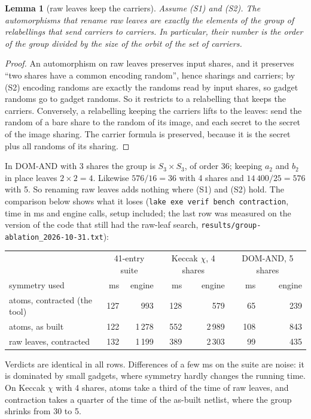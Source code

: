 \documentclass[11pt,a4paper]{article}
\newtheorem{lemma}[theorem]{Lemma}
\theoremstyle{definition}
\theoremstyle{remark}
\newcommand{\code}[1]{\texttt{\small #1}}
\begin{document}
\begin{lemma}[raw leaves keep the carriers]\label{lem:carriers}
Assume (S1) and (S2).  The automorphisms that rename raw leaves are exactly the elements of the
group of relabellings that send carriers to carriers.  In particular, their number is the order
of the group divided by the size of the orbit of the set of carriers.
\end{lemma}
\begin{proof}
An automorphism on raw leaves preserves input shares, and it preserves ``two shares have a common
encoding random'', hence sharings and carriers; by (S2) encoding randoms are exactly the randoms
read by input shares, so gadget randoms go to gadget randoms.  So it restricts to a relabelling
that keeps the carriers.  Conversely, a relabelling keeping the carriers lifts to the leaves:
send the random of a bare share to the random of its image, and each secret to the secret of the
image sharing.  The carrier formula is preserved, because it is the secret plus all randoms of
its sharing.
\end{proof}

In DOM-AND with 3 shares the group is $S_3\times S_3$, of order 36; keeping $a_2$ and $b_2$ in
place leaves $2\times 2=4$.  Likewise $576/16 = 36$ with 4 shares and $14\,400/25=576$ with 5.
So renaming raw leaves adds nothing where (S1) and (S2) hold.  The comparison below shows what it
loses (\code{lake exe verif bench contraction}, time in ms and engine calls, setup included; the
last row was measured on the version of the code that still had the raw-leaf search,
\code{results/group-ablation\_2026-10-31.txt}):
\begin{center}\small
\begin{tabular}{@{}lrrrrrr@{}}
\toprule
 & \multicolumn{2}{c}{41-entry suite} & \multicolumn{2}{c}{Keccak $\chi$, 4 shares} & \multicolumn{2}{c}{DOM-AND, 5 shares}\\
symmetry used & ms & engine & ms & engine & ms & engine\\
\midrule
atoms, contracted (the tool) & 127 & 993 & 128 & 579 & 65 & 239\\
atoms, as built & 122 & 1\,278 & 552 & 2\,989 & 108 & 843\\
raw leaves, contracted & 132 & 1\,199 & 389 & 2\,303 & 99 & 435\\
\bottomrule
\end{tabular}
\end{center}
Verdicts are identical in all rows.  Differences of a few ms on the suite are noise: it is dominated
by small gadgets, where symmetry hardly changes the running time.  On Keccak $\chi$ with 4 shares,
atoms take a third of the time of raw leaves, and contraction takes a quarter of the time of the
as-built netlist, where the group shrinks from 30 to 5.
\end{document}
